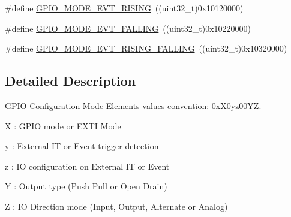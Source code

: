 \begin{DoxyCompactItemize}
\item 
\#define \hyperlink{group___g_p_i_o__mode_ga97d78b82ea178ff7a4c35aa60b4e9338}{G\-P\-I\-O\-\_\-\-M\-O\-D\-E\-\_\-\-E\-V\-T\-\_\-\-R\-I\-S\-I\-N\-G}~((uint32\-\_\-t)0x10120000)
\item 
\#define \hyperlink{group___g_p_i_o__mode_gadbfa532b3566783ac6c0e07c2e0ffe5e}{G\-P\-I\-O\-\_\-\-M\-O\-D\-E\-\_\-\-E\-V\-T\-\_\-\-F\-A\-L\-L\-I\-N\-G}~((uint32\-\_\-t)0x10220000)
\item 
\#define \hyperlink{group___g_p_i_o__mode_ga1b760771297ed2fc55a6b13071188491}{G\-P\-I\-O\-\_\-\-M\-O\-D\-E\-\_\-\-E\-V\-T\-\_\-\-R\-I\-S\-I\-N\-G\-\_\-\-F\-A\-L\-L\-I\-N\-G}~((uint32\-\_\-t)0x10320000)
\end{DoxyCompactItemize}


\subsection{Detailed Description}
G\-P\-I\-O Configuration Mode Elements values convention\-: 0x\-X0yz00\-Y\-Z. 
\begin{DoxyItemize}
\item X \-: G\-P\-I\-O mode or E\-X\-T\-I Mode
\item y \-: External I\-T or Event trigger detection
\item z \-: I\-O configuration on External I\-T or Event
\item Y \-: Output type (Push Pull or Open Drain)
\item Z \-: I\-O Direction mode (Input, Output, Alternate or Analog) 
\end{DoxyItemize}

